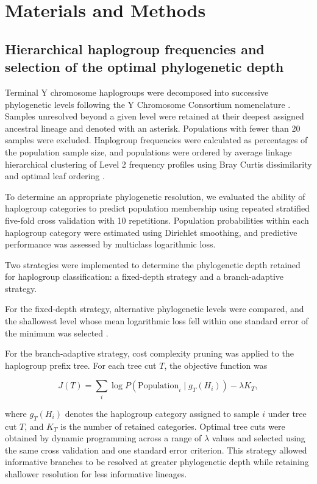 \documentclass[12pt]{article}
\begin{document}
\MakeManuscriptTitle

\section{Materials and Methods}

\subsection{Hierarchical haplogroup frequencies and selection of the optimal phylogenetic depth}

Terminal Y chromosome haplogroups were decomposed into successive phylogenetic levels following the Y Chromosome Consortium nomenclature \parencite{ycc2002,karafet2008}. Samples unresolved beyond a given level were retained at their deepest assigned ancestral lineage and denoted with an asterisk. Populations with fewer than 20 samples were excluded. Haplogroup frequencies were calculated as percentages of the population sample size, and populations were ordered by average linkage hierarchical clustering of Level 2 frequency profiles using Bray Curtis dissimilarity \parencite{bray1957} and optimal leaf ordering \parencite{barjoseph2001}.

To determine an appropriate phylogenetic resolution, we evaluated the ability of haplogroup categories to predict population membership using repeated stratified five-fold cross validation with 10 repetitions. Population probabilities within each haplogroup category were estimated using Dirichlet smoothing, and predictive performance was assessed by multiclass logarithmic loss.

Two strategies were implemented to determine the phylogenetic depth retained for haplogroup classification: a fixed-depth strategy and a branch-adaptive strategy.

For the fixed-depth strategy, alternative phylogenetic levels were compared, and the shallowest level whose mean logarithmic loss fell within one standard error of the minimum was selected \parencite{breiman1984,hastie2009}.

For the branch-adaptive strategy, cost complexity pruning was applied to the haplogroup prefix tree. For each tree cut $T$, the objective function was

\begin{equation*}
J(T)=\sum_i \log P\left(\text{Population}_i \mid g_T(H_i)\right)-\lambda K_T,
\end{equation*}

where $g_T(H_i)$ denotes the haplogroup category assigned to sample $i$ under tree cut $T$, and $K_T$ is the number of retained categories. Optimal tree cuts were obtained by dynamic programming across a range of $\lambda$ values and selected using the same cross validation and one standard error criterion. This strategy allowed informative branches to be resolved at greater phylogenetic depth while retaining shallower resolution for less informative lineages.
\end{document}

